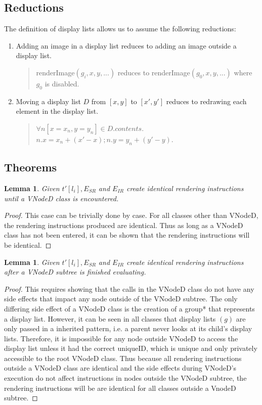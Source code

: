 \documentclass[11pt]{article}
\newtheorem{lemma}[theorem]{Lemma}
\begin{document}
\subsection{Reductions}
The definition of display lists allows us to assume the following reductions:

\begin{enumerate}
\item Adding an image in a display list reduces to adding an image outside a display list.
\begin{quote} renderImage$(g_i, x, y, ...)$ reduces to renderImage$(g_0, x, y,...)$ where $g_0$ is disabled.\end{quote}
\item Moving a display list $D$ from $[x, y]$ to $[x', y']$ reduces to redrawing each element in the display list.
\begin{quote} $\forall n[x=x_n, y=y_n] \in D.contents$. $n.x=x_n + (x'-x); n.y=y_n + (y'-y)$. \end{quote}
\end{enumerate}

\subsection{Theorems}

\begin{lemma} Given $t'[l_i], E_{SR}$ and $E_{IR}$ create identical rendering instructions until a VNodeD class is encountered. \end{lemma}
\begin{proof}
This case can be trivially done by case. For all classes other than VNodeD, the rendering instructions produced are identical. Thus as long as a VNodeD class has not been entered, it can be shown that the rendering instructions will be identical.
\end{proof}

\begin{lemma} Given $t'[l_i], E_{SR}$ and $E_{IR}$ create identical rendering instructions after a VNodeD subtree is finished evaluating. \end{lemma}
\begin{proof}
This requires showing that the calls in the VNodeD class do not have any side effects that impact any node outside of the VNodeD subtree. The only differing side effect of a VNodeD class is the creation of a group* that represents a display list. However, it can be seen in all classes that display lists $(g)$ are only passed in a inherited pattern, i.e. a parent never looks at its child's display lists. Therefore, it is impossible for any node outside VNodeD to access the display list unless it had the correct uniqueID, which is unique and only privately accessible to the root VNodeD class. Thus because all rendering instructions outside a VNodeD class are identical and the side effects during VNodeD's execution do not affect instructions in nodes outside the VNodeD subtree, the rendering instructions will be are identical for all classes outside a VnodeD subtree.
\end{proof}
\end{document}

